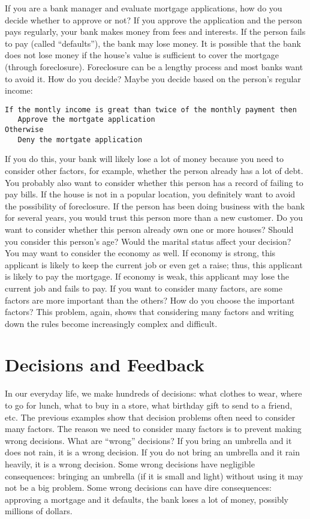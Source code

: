 If you are a bank manager and evaluate mortgage applications, how do
you decide whether to approve or not?  If you approve the application
and the person pays regularly, your bank makes money from fees and
interests.  If the person fails to pay (called ``defaults''), the bank
may lose money. It is possible that the bank does not lose money
if the house's value is sufficient to cover the mortgage (through
foreclosure). Foreclosure can be a lengthy process and most banks want
to avoid it.  How do you decide? Maybe you decide based on the
person's regular income:  


\begin{verbatim}
If the montly income is great than twice of the monthly payment then
   Approve the mortgate application
Otherwise
   Deny the mortgate application
\end{verbatim}

If you do this, your bank will likely lose a lot of money because you
need to consider other factors, for example, whether the person
already has a lot of debt. You probably also want to consider whether
this person has a record of failing to pay bills.  If the house is not
in a popular location, you definitely want to avoid the possibility of
foreclosure. If the person has been doing business with the bank for
several years, you would trust this person more than a new customer.
Do you want to consider whether this person already own one or more
houses?  Should you consider this person's age?  Would the marital
status affect your decision?  You may want to consider the economy as
well. If economy is strong, this applicant is likely to keep the
current job or even get a raise; thus, this applicant is likely to pay
the mortgage. If economy is weak, this applicant may lose the current
job and fails to pay.  If you want to consider many factors, are some
factors are more important than the others? How do you choose the
important factors?  This problem, again, shows that considering many
factors and writing down the rules become increasingly complex and
difficult.

\section{Decisions and Feedback}

In our everyday life, we make hundreds of decisions: what clothes to
wear, where to go for lunch, what to buy in a store, what birthday
gift to send to a friend, etc.  The previous examples show that
decision problems often need to consider many factors.  The reason we
need to consider many factors is to prevent making wrong decisions.
What are ``wrong'' decisions? If you bring an umbrella and it does not
rain, it is a wrong decision.  If you do not bring an umbrella and it
rain heavily, it is a wrong decision.  Some wrong decisions have
negligible consequences: bringing an umbrella (if it is small and
light) without using it may not be a big problem.  Some wrong
decisions can have dire consequences: approving a mortgage and it
defaults, the bank loses a lot of money, possibly 
millions of dollars.

